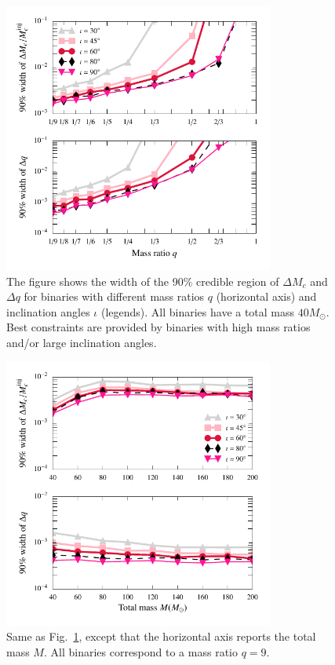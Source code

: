 \documentclass[prl,preprintnumbers,twocolumn,eqsecnum,floatfix,a4paper,nofootinbib,superscriptaddress]{revtex4}
\begin{document}
\begin{figure}[tbh]
	\includegraphics*[width=3.5in]{figs/fig3a_9dim_dmcbymcinj_dq_abhi_q_leq_1.pdf}
	\caption{The figure shows the width of the 90$\%$ credible region of $\Delta M_c$ and $\Delta q$ for binaries with different mass ratios $q$ (horizontal axis) and inclination angles $\iota$ (legends). All binaries have a total mass $40M_{\odot}$. Best constraints are provided by binaries with high mass ratios and/or large inclination angles.}
	\label{fig:dMc_dq_posteriors_gr_vs_q}
\end{figure}

\begin{figure}[tbh]
	\includegraphics*[width=3.5in]{figs/fig3b_9dim_dmcbymcinj_dq_abhi.pdf}
	\caption{Same as Fig.~\ref{fig:dMc_dq_posteriors_gr_vs_q}, except that the horizontal axis reports the total mass $M$. All binaries correspond to a mass ratio $q = 9$.}
	\label{fig:dMc_dq_posteriors_gr_vs_M}
\end{figure}
\end{document}
